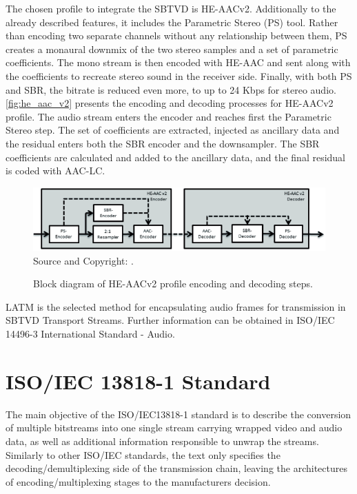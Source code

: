 \documentclass[
	12pt,				%
	openright,			%
	twoside,			%
	a4paper,			%
	brazil,
	french,				%
	english
	]{abntex2}
\begin{document}
The chosen profile to integrate the SBTVD is HE-AACv2. Additionally to the already described features, it includes the Parametric Stereo (PS) tool. Rather than encoding two separate channels without any relationship between them, PS creates a monaural downmix of the two stereo samples and a set of parametric coefficients. The mono stream is then encoded with HE-AAC and sent along with the coefficients to recreate stereo sound in the receiver side. Finally, with both PS and SBR, the bitrate is reduced even more, to up to 24 Kbps for stereo audio. \autoref{fig:he_aac_v2} presents the encoding and decoding processes for HE-AACv2 profile. The audio stream enters the encoder and reaches first the Parametric Stereo step. The set of coefficients are extracted, injected as ancillary data and the residual enters both the SBR encoder and the downsampler. The SBR coefficients are calculated and added to the ancillary data, and the final residual is coded with AAC-LC.

\begin{figure}
\centering
\caption{Block diagram of HE-AACv2 profile encoding and decoding steps.}
\includegraphics[width=1\linewidth]{figuras/he_aac_v2.png}
\\Source and Copyright: \cite{fraunhofer}.
\label{fig:he_aac_v2}
\end{figure}

LATM is the selected method for encapsulating audio frames for transmission in SBTVD Transport Streams. Further information can be obtained in ISO/IEC 14496-3 International Standard - Audio.

\chapter{ISO/IEC 13818-1 Standard}
\label{iso13818}
The main objective of the ISO/IEC13818-1 standard is to describe the conversion of multiple bitstreams into one single stream carrying wrapped video and audio data, as well as additional information responsible to unwrap the streams. Similarly to other ISO/IEC standards, the text only specifies the decoding/demultiplexing side of the transmission chain, leaving the architectures of encoding/multiplexing stages to the manufacturers decision.
\end{document}
